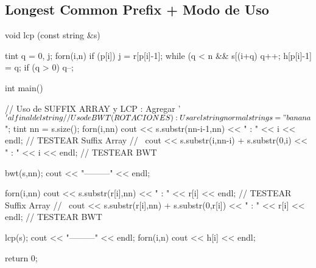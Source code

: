 \subsection{Longest Common Prefix + Modo de Uso}

\begin{code}
void lcp (const string &s)
{
	tint q = 0, j;
	forn(i,n)
	{
		if (p[i])
		{
			j = r[p[i]-1];
			while (q < n && s[(i+q)%
			q++;
			h[p[i]-1] = q;
			if (q > 0)
			q--;
		}
	}
	
}

int main()
{
	// Uso de SUFFIX ARRAY y LCP : Agregar '$' al final del string
	// Uso de BWT (ROTACIONES) : Usar el string normal
	
	string s = "banana$";
	tint nn = s.size();
	forn(i,nn)
		cout << s.substr(nn-i-1,nn) << " : " << i << endl; // TESTEAR Suffix Array
		//~ cout << s.substr(i,nn-i) + s.substr(0,i) << " : " << i << endl; // TESTEAR BWT
	
	bwt(s,nn);
	cout << "---------" << endl;
	
	
	forn(i,nn)
		cout << s.substr(r[i],nn) << " : " << r[i] << endl; // TESTEAR Suffix Array
		//~ cout << s.substr(r[i],nn) + s.substr(0,r[i]) << " : " << r[i] << endl; // TESTEAR BWT
	
	lcp(s);
	cout << "---------" << endl;
	forn(i,n)
		cout << h[i] << endl;
	
	
	return 0;
}

\end{code}
